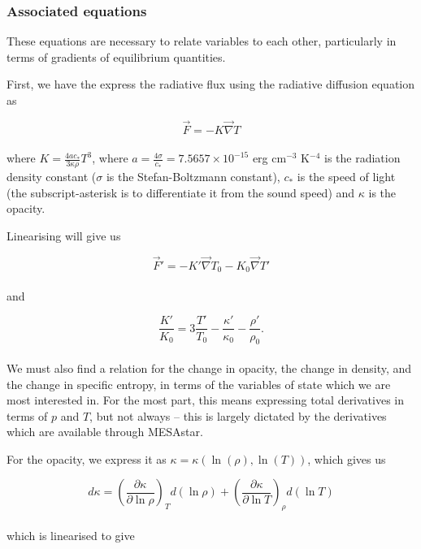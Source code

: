 \documentclass[11pt]{amsart}
\begin{document}
\subsubsection{Associated equations}

These equations are necessary to relate variables to each other, particularly in terms of gradients of
equilibrium quantities.

First, we have the express the radiative flux using the radiative diffusion equation as

\begin{equation}
\vec{F} = - K \vec{\nabla} T
\end{equation}
\\
where $K = \frac{4 a c_{*}}{3 \kappa \rho} T^{3}$, where $a = \frac{4 \sigma}{c_{*}} = 7.5657 \times 10^{-15}$ 
erg cm$^{-3}$ K$^{-4}$ is the radiation density constant ($\sigma$ is the Stefan-Boltzmann constant),
$c_{*}$ is the speed of light (the subscript-asterisk is to differentiate it from the sound speed) 
and $\kappa$ is the opacity.

Linearising will give us

\begin{equation}
\vec{F}' = - K' \vec{\nabla} T_{0} - K_{0} \vec{\nabla} T'
\end{equation}
\\
and

\begin{equation}
\frac{K'}{K_{0}} = 3 \frac{T'}{T_{0}} - \frac{\kappa'}{\kappa_{0}} - \frac{\rho'}{\rho_{0}}.
\end{equation}
\\

We must also find a relation for the change in opacity, the change in density, and the change in specific entropy,
in terms of the variables of state which we are most interested in.  For the most part, this
means expressing total derivatives in terms of $p$ and $T$, but not always -- this is largely
dictated by the derivatives which are available through MESAstar.

For the opacity, we express it as $\kappa = \kappa \left( \ln (\rho) , \ln(T) \right)$, which gives us

\begin{equation}
d\kappa = \left( \frac{\partial \kappa}{\partial \ln \rho} \right)_{T} d(\ln \rho) + \left( \frac{\partial \kappa}{\partial \ln T} \right)_{\rho} d(\ln T)
\end{equation}
\\
which is linearised to give
\end{document}
